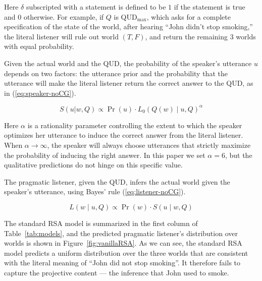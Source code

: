 Here $\delta$ subscripted with a statement is defined to be $1$ if the statement 
 is true and $0$ otherwise.
For example, if $Q$ is QUD$_\textrm{max}$, which asks for a complete specification of the state of the world, after hearing ``John didn't stop smoking,'' the literal listener will rule out world $(T, F)$, and return the remaining 3 worlds with equal probability.


Given the actual world and the QUD, the probability of 
 the speaker's utterance $u$ depends on two factors: the utterance prior 
 and the probability that the utterance will make the literal listener 
 return the correct answer to the QUD, as in (\ref{eq:speaker-noCG}).

\vspace{-1.5ex} 
\begin{equation}
S(u | w, Q) \propto \Pr(u) \cdot L_0(Q(w) \mid u, Q)^\alpha 
\label{eq:speaker-noCG}
\end{equation}

\vspace{-0.5ex} 
Here $\alpha$ is a rationality parameter controlling the extent to which 
 the speaker optimizes her utterance to induce the correct answer from the 
 literal listener. 
When $\alpha \rightarrow \infty$, the speaker will always choose utterances that 
 strictly maximize the probability of inducing the right answer.
In this paper we set $\alpha=6$, but the qualitative predictions do not hinge on 
 this specific value.

The pragmatic listener, given the QUD, infers the actual world given the speaker's utterance, using Bayes' rule (\ref{eq:listener-noCG}).

\vspace{-2ex} 
\begin{equation}
L(w \mid u, Q) \propto \Pr(w) \cdot S(u \mid w, Q) \label{eq:listener-noCG}
\end{equation}
\vspace{-4ex} 

The standard RSA model is summarized in the first column of Table~\ref{tab:models},
 and the predicted pragmatic listener's distribution over worlds is shown in Figure~\ref{fig:vanillaRSA}.
As we can see, the standard RSA model predicts a uniform distribution over the
 three worlds that are consistent with the literal meaning of 
 ``John did not stop smoking''. It therefore fails to capture the projective content --- the inference that  
 John used to smoke.


